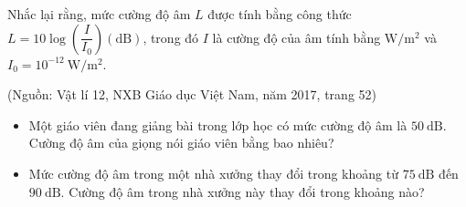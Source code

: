 \begin{bt}%
	Nhắc lại rằng, mức cường độ âm $L$ được tính bằng công thức $L=10 \log \left(\dfrac{I}{I_0}\right)(\mathrm{dB})$, trong đó $I$ là cường độ của âm tính bằng $\mathrm{W}/ \mathrm{m}^2$ và $I_0=10^{-12} \mathrm{~W} / \mathrm{m}^2$.
	\begin{flushright}
		(Nguồn: Vật lí 12, NXB Giáo dục Việt Nam, năm 2017, trang 52)
	\end{flushright}
	\begin{itemize}
		\item[a)] Một giáo viên đang giảng bài trong lớp học có mức cường độ âm là $50 \mathrm{~dB}$. Cường độ âm của giọng nói giáo viên bằng bao nhiêu?
		\item[b)] Mức cường độ âm trong một nhà xưởng thay đổi trong khoảng từ $75 \mathrm{~dB}$ đến $90 \mathrm{~dB}$. Cường độ âm trong nhà xưởng này thay đổi trong khoảng nào?
	\end{itemize}
\end{bt}
